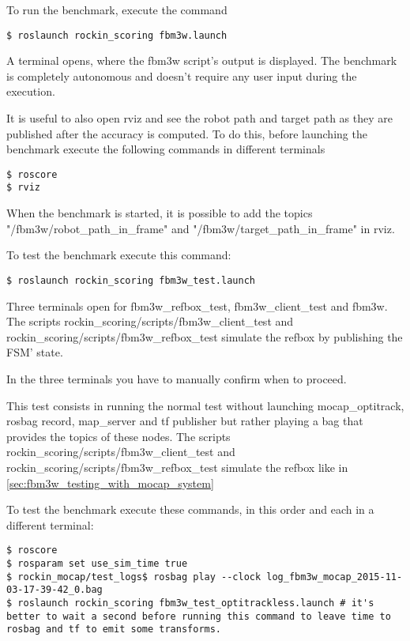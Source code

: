 \documentclass[a4paper]{article}
\begin{document}

To run the benchmark, execute the command
\begin{verbatim}
$ roslaunch rockin_scoring fbm3w.launch
\end{verbatim} 

A terminal opens, where the fbm3w script's output is displayed.
The benchmark is completely autonomous and doesn't require any user input during the execution.

It is useful to also open rviz and see the robot path and target path as they are published after the accuracy is computed.
To do this, before launching the benchmark execute the following commands in different terminals
\begin{verbatim}
$ roscore
$ rviz
\end{verbatim}
When the benchmark is started, it is possible to add the topics "/fbm3w/robot_path_in_frame" and "/fbm3w/target_path_in_frame" in rviz.

\label{sec:fbm3w_testing_with_mocap_system}

To test the benchmark execute this command:
\begin{verbatim}
$ roslaunch rockin_scoring fbm3w_test.launch
\end{verbatim} 

Three terminals open for fbm3w\_refbox\_test, fbm3w\_client\_test and fbm3w.
The scripts rockin\_scoring/scripts/fbm3w\_client\_test and rockin\_scoring/scripts/fbm3w\_refbox\_test simulate the refbox by publishing the FSM' state.

In the three terminals you have to manually confirm when to proceed.



This test consists in running the normal test without launching mocap\_optitrack, rosbag record, map\_server and tf publisher but rather playing a bag that provides the topics of these nodes.
The scripts rockin\_scoring/scripts/fbm3w\_client\_test and rockin\_scoring/scripts/fbm3w\_refbox\_test simulate the refbox like in \ref{sec:fbm3w_testing_with_mocap_system}

To test the benchmark execute these commands, in this order and each in a different terminal:
\begin{verbatim}
$ roscore
$ rosparam set use_sim_time true
$ rockin_mocap/test_logs$ rosbag play --clock log_fbm3w_mocap_2015-11-03-17-39-42_0.bag
$ roslaunch rockin_scoring fbm3w_test_optitrackless.launch # it's better to wait a second before running this command to leave time to rosbag and tf to emit some transforms.
\end{verbatim} 
\end{document}

